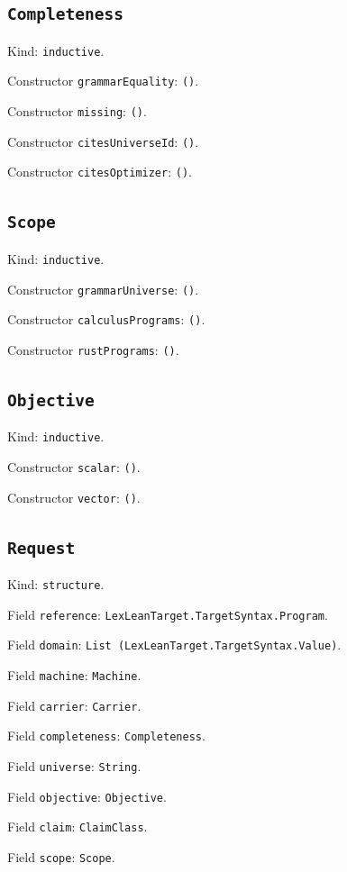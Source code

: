 \documentclass[11pt]{article}
\begin{document}
\subsection*{\texttt{Completeness}}
\noindent Kind: \texttt{inductive}.\par
\noindent Constructor \texttt{grammarEquality}: \texttt{()}.\par
\noindent Constructor \texttt{missing}: \texttt{()}.\par
\noindent Constructor \texttt{citesUniverseId}: \texttt{()}.\par
\noindent Constructor \texttt{citesOptimizer}: \texttt{()}.\par
\subsection*{\texttt{Scope}}
\noindent Kind: \texttt{inductive}.\par
\noindent Constructor \texttt{grammarUniverse}: \texttt{()}.\par
\noindent Constructor \texttt{calculusPrograms}: \texttt{()}.\par
\noindent Constructor \texttt{rustPrograms}: \texttt{()}.\par
\subsection*{\texttt{Objective}}
\noindent Kind: \texttt{inductive}.\par
\noindent Constructor \texttt{scalar}: \texttt{()}.\par
\noindent Constructor \texttt{vector}: \texttt{()}.\par
\subsection*{\texttt{Request}}
\noindent Kind: \texttt{structure}.\par
\noindent Field \texttt{reference}: \texttt{LexLeanTarget.TargetSyntax.Program}.\par
\noindent Field \texttt{domain}: \texttt{List (LexLeanTarget.TargetSyntax.Value)}.\par
\noindent Field \texttt{machine}: \texttt{Machine}.\par
\noindent Field \texttt{carrier}: \texttt{Carrier}.\par
\noindent Field \texttt{completeness}: \texttt{Completeness}.\par
\noindent Field \texttt{universe}: \texttt{String}.\par
\noindent Field \texttt{objective}: \texttt{Objective}.\par
\noindent Field \texttt{claim}: \texttt{ClaimClass}.\par
\noindent Field \texttt{scope}: \texttt{Scope}.\par
\end{document}
